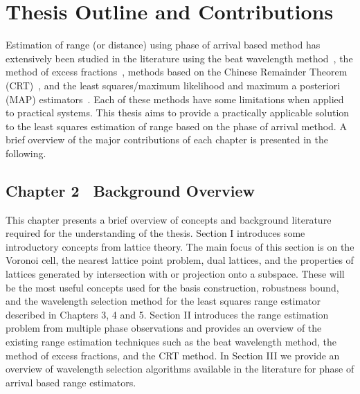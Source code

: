 \section{Thesis Outline and Contributions}
Estimation of range (or distance) using phase of arrival based method has extensively been studied in the literature using the beat wavelength method~\cite{Towers_frequency_selection_interferometry_2003,Towers:04_generalised_frequency_selection}, the method of excess fractions~\cite{Falaggis_excess_fractions_2011,Falaggis_excess_fractions_2012,Falaggis_excess_fractions_2013,Falaggis_algebraic_solution_2014}, methods based on the Chinese Remainder Theorem (CRT)~\cite{Oystein_Ore_general_chinese_Remainder_1952, Oded_Chinese_remaindering_with_errors_2000, Xia_generalised_CRT_2005, Xia2007, XWLi2008, W.Wang_closed_form_crt_2010, YangBin_range_estimation_with_CRT_2014, Xiao_multistage_crt_2014}, and the least squares/maximum likelihood and maximum a posteriori (MAP) estimators~\cite{Teunissen_GPS_1995, Hassibi_GPS_1998, Li_distance_est_wrapped_phase}. Each of these methods have some limitations when applied to practical systems. This thesis aims to provide a practically applicable solution to the least squares estimation of range based on the phase of arrival method. A brief overview of the major contributions of each chapter is presented in the following.

\subsection*{Chapter 2 \textemdash~Background Overview}
This chapter presents a brief overview of concepts and background literature required for the understanding of the thesis. Section I introduces some introductory concepts from lattice theory. The main focus of this section is on the Voronoi cell, the nearest lattice point problem, dual lattices, and the properties of lattices generated by intersection with or projection onto a subspace. These will be the most useful concepts used for the basis construction, robustness bound, and the wavelength selection method for the least squares range estimator described in Chapters 3, 4 and 5. Section II introduces the range estimation problem from multiple phase observations and provides an overview of the existing range estimation techniques such as the beat wavelength method, the method of excess fractions, and the CRT method. In Section III we provide an overview of wavelength selection algorithms available in the literature for phase of arrival based range estimators.

